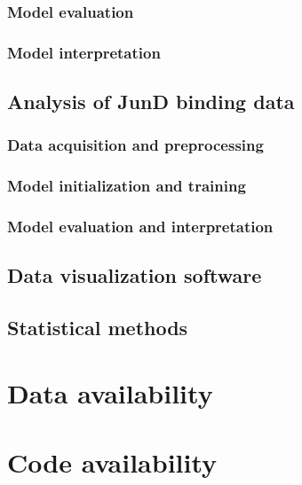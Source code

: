\subsubsection{Model evaluation}

\subsubsection{Model interpretation}

\subsection{Analysis of JunD binding data}

\subsubsection{Data acquisition and preprocessing}

\subsubsection{Model initialization and training}

\subsubsection{Model evaluation and interpretation}

\subsection{Data visualization software}

\subsection{Statistical methods}

\section{Data availability}

\section{Code availability}

